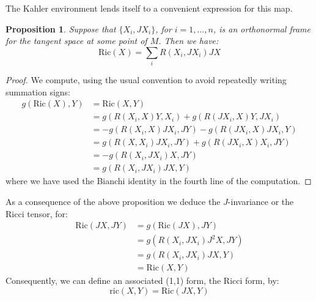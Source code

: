 \documentclass[11pt]{amsart}
\newtheorem{prop}[subsection]{Proposition}
\theoremstyle{definition}
\def \Ric{ \text{Ric} }
\def \ric{ \text{ric} }
\begin{document}
The Kahler environment lends itself to a convenient expression for this map.
%
\begin{prop} Suppose that $\{X_i, JX_i\}$, for $i=1,\ldots,n$, is an orthonormal frame for the tangent space at some point of $M$.  Then we have:
$$ \Ric (X) = \sum_i R(X_i, JX_i) JX $$
\end{prop}
%
\begin{proof}
We compute, using the usual convention to avoid repeatedly writing summation signs:
%
\begin{align*}
g( \Ric(X), Y ) &= \Ric(X,Y) \\
&= g( R ( X_i, X ) Y, X_i ) + g( R ( J X_i, X ) Y, J X_i ) \\
&= - g( R( X_i, X ) J X_i, J Y ) - g( R( J X_i, X )J X_i, Y ) \\
&= g( R( X, X_i ) J X_i, J Y ) + g( R( J X_i, X ) X_i, JY ) \\
&= - g( R( X_i, J X_i ) X, JY ) \\
&= g( R( X_i, J X_i ) JX, Y )
\end{align*}
%
where we have used the Bianchi identity in the fourth line of the computation. 
%
\end{proof}
%
As a consequence of the above proposition we deduce the $J$-invariance or the Ricci tensor, for:
%
\begin{align*}
\Ric( JX, JY ) &= g( \Ric( JX ), JY ) \\
&= g( R( X_i, J X_i ) J^2 X, JY ) \\
&= g( R(X_i, J X_i ) JX, Y ) \\
&= \Ric( X, Y )
\end{align*}
%
Consequently, we can define an associated (1,1) form, the Ricci form, by:
%
$$ \ric(X,Y) = \Ric(JX, Y)$$
\end{document}
